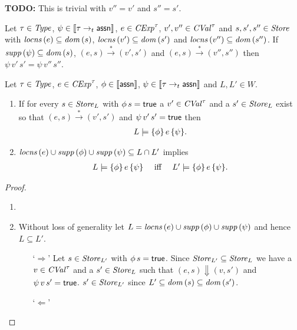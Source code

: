 \documentclass[12pt,a4paper]{report}
\newcommand{\CExp}{\nstyle{CExp}}
\newcommand{\CVal}{\nstyle{CVal}}
\begin{document}
{\bf TODO:} This is trivial with $v'' = v'$ and $s'' = s'$.

\begin{lemma}
  Let $\tau\in\mathit{Type}$, $\psi\in\llbracket\tau\rightarrow_t\mathsf{assn}\rrbracket$,
  $e\in\CExp^\tau$, $v',v''\in\CVal^\tau$ and $s,s',s''\in\mathit{Store}$
  with $\mathit{locns}\,(e)\subseteq \mathit{dom}\,(s)$, $\mathit{locns}\,(v')\subseteq\mathit{dom}\,(s')$
  and $\mathit{locns}\,(v'')\subseteq \mathit{dom}\,(s'')$.
  If $\mathit{supp}\,(\psi) \subseteq \mathit{dom}\,(s)$, $(e,s)\xrightarrow*(v',s')$
  and $(e,s)\xrightarrow*(v'',s'')$ then $\psi\,v'\,s'=\psi\,v''\,s''$.
\end{lemma}

\begin{lemma}
  Let $\tau\in\mathit{Type}$, $e\in\CExp^\tau$, $\phi\in\llbracket\mathsf{assn}\rrbracket$, $\psi\in\llbracket\tau\rightarrow_t\mathsf{assn}\rrbracket$
  and $L,L'\in W$.
  \begin{enumerate}
    \item If for every $s \in \mathit{Store}_L$ with $\phi\,s=\mathsf{true}$ a $v'\in\CVal^\tau$ and a
          $s'\in\mathit{Store}_L$ exist so that $(e,s) \xrightarrow* (v',s')$ and $\psi\,v'\,s'=\mathsf{true}$ then
          \[\begin{array}{rcl}
            L\models\{\phi\}\,e\,\{\psi\}.
          \end{array}\]

    \item $\mathit{locns}\,(e)\cup\mathit{supp}\,(\phi)\cup\mathit{supp}\,(\psi) \subseteq L \cap L'$ implies
          \[\begin{array}{rcl}
            L\models\{\phi\}\,e\,\{\psi\} &\text{ iff }& L'\models\{\phi\}\,e\,\{\psi\}.
          \end{array}\]
  \end{enumerate}
\end{lemma}

\begin{proof} \
  \begin{enumerate}
    \item

    \item Without loss of generality let $L= \mathit{locns}\,(e)\cup\mathit{supp}\,(\phi)\cup\mathit{supp}\,(\psi)$ and hence $L \subseteq L'$.
          \begin{itemize}
            \item[`$\Rightarrow$']
                  Let $s\in\mathit{Store}_{L'}$ with $\phi\,s=\mathsf{true}$. Since $\mathit{Store}_{L'} \subseteq \mathit{Store}_L$ we have
                  a $v\in\CVal^\tau$ and a $s'\in\mathit{Store}_L$ such that $(e,s)\Downarrow(v,s')$ and
                  $\psi\,v\,s'=\mathsf{true}$. $s'\in\mathit{Store}_{L'}$ since $L'\subseteq\mathit{dom}\,(s)\subseteq\mathit{dom}\,(s')$.

            \item[`$\Leftarrow$']
          \end{itemize}
  \end{enumerate}
\end{proof}
\end{document}
